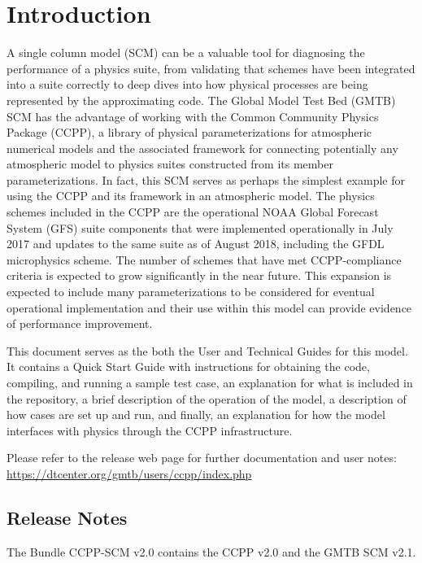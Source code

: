 \chapter{Introduction}
\label{chapter: introduction}

A single column model (SCM) can be a valuable tool for diagnosing the performance of a physics suite, from validating that schemes have been integrated into a suite correctly to deep dives into how physical processes are being represented by the approximating code. The Global Model Test Bed (GMTB) SCM has the advantage of working with the Common Community Physics Package (CCPP), a library of physical parameterizations for atmospheric numerical models and the associated framework for connecting potentially any atmospheric model to physics suites constructed from its member parameterizations. In fact, this SCM serves as perhaps the simplest example for using the CCPP and its framework in an atmospheric model. The physics schemes included in the CCPP are the operational NOAA Global Forecast System (GFS) suite components that were implemented operationally in July 2017 and updates to the same suite as of August 2018, including the GFDL microphysics scheme. The number of schemes that have met CCPP-compliance criteria is expected to grow significantly in the near future. This expansion is expected to include many parameterizations to be considered for eventual operational implementation and their use within this model can provide evidence of performance improvement.

This document serves as the both the User and Technical Guides for this model. It contains a Quick Start Guide with instructions for obtaining the code, compiling, and running a sample test case, an explanation for what is included in the repository, a brief description of the operation of the model, a description of how cases are set up and run, and finally, an explanation for how the model interfaces with physics through the CCPP infrastructure.

Please refer to the release web page for further documentation and user notes:\\ \url{https://dtcenter.org/gmtb/users/ccpp/index.php}

\section{Release Notes}

The Bundle CCPP-SCM v2.0 contains the CCPP v2.0 and the GMTB SCM v2.1.

